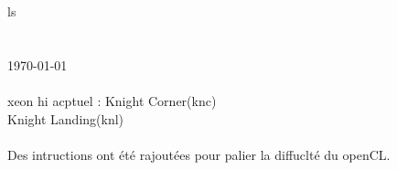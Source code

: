 ls\documentclass{article}
\begin{document}
\section{}
\paragraph{}
\today
\paragraph{}
xeon hi acptuel : Knight Corner(knc)\\
	 		   Knight Landing(knl)\\



\paragraph{}
Des intructions ont été rajoutées  pour palier la diffuclté du openCL.
\end{document}
